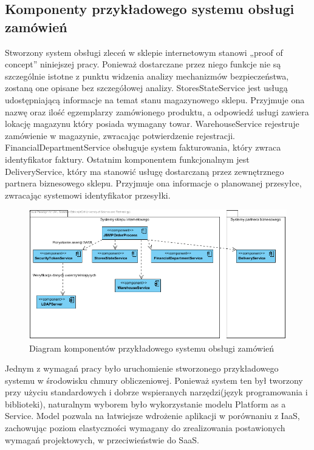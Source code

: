 	\subsection{Komponenty przykładowego systemu obsługi zamówień}	
		
		Stworzony system obsługi zleceń w sklepie internetowym stanowi „proof of concept” niniejszej pracy. Ponieważ dostarczane przez niego funkcje nie są szczególnie istotne z punktu widzenia analizy mechanizmów bezpieczeństwa, zostaną one opisane bez szczegółowej analizy. StoresStateService jest usługą udostępniającą informacje na temat stanu magazynowego sklepu. Przyjmuje ona nazwę oraz ilość egzemplarzy zamówionego produktu, a odpowiedź usługi zawiera lokację magazynu który posiada wymagany towar. WarehouseService rejestruje zamówienie w magazynie, zwracając potwierdzenie rejestracji. FinancialDepartmentService obsługuje system fakturowania, który zwraca identyfikator faktury. Ostatnim komponentem funkcjonalnym jest DeliveryService, który ma stanowić usługę dostarczaną przez zewnętrznego partnera biznesowego sklepu. Przyjmuje ona informacje o planowanej przesyłce, zwracając systemowi identyfikator przesyłki. 
		
		\begin{figure}[h]
			\centering
			\includegraphics[width=\textwidth]{img/KomponentySystemu.png}
			\caption{Diagram komponentów przykładowego systemu obsługi zamówień}
			\label{Komponenty}
		\end{figure}	
		

\label{sec:srodowiskoWdrozenia}

Jednym z wymagań pracy było uruchomienie stworzonego przykładowego systemu w środowisku chmury obliczeniowej. Ponieważ system ten był tworzony przy użyciu standardowych i dobrze wspieranych narzędzi(język programowania i biblioteki), naturalnym wyborem było wykorzystanie modelu Platform as a Service. Model pozwala na łatwiejsze wdrożenie aplikacji w porównaniu z IaaS, zachowując poziom elastyczności wymagany do zrealizowania postawionych wymagań projektowych, w przeciwieństwie do SaaS.

